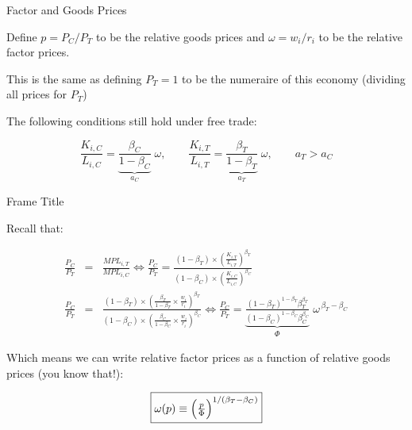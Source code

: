\documentclass[notes,11pt, aspectratio=169, xcolor=table]{beamer}
\newenvironment{wideitemize}{\itemize\addtolength{\itemsep}{10pt}}{\enditemize}
\begin{document}
\begin{frame}{Factor and Goods Prices}
    \begin{wideitemize}
        \item Define $p = P_C / P_T$ to be the relative goods prices and $\omega = w_i /r_i$ to be the relative factor prices. 

        \item This is the same as defining $P_T=1$ to be the numeraire of this economy (dividing all prices for $P_T$)

        \item The following conditions still hold under free trade:

        \begin{equation*}
            \frac{K_{i,C}}{L_{i,C}} = 
      \underbrace{\frac{\beta_C}{1-\beta_C}}_{a_C}\;
      \omega,\qquad \frac{K_{i,T}}{L_{i,T}} = 
      \underbrace{\frac{\beta_T}{1-\beta_T}}_{a_T}\;
      \omega, \qquad a_T>a_C
        \end{equation*}

    \end{wideitemize}
\end{frame}

\begin{frame}{Frame Title}
    \begin{wideitemize}
        \item Recall that:

    \begin{eqnarray*}
        \frac{P_C}{P_T} &=& \frac{MPL_{i,T}}{MPL_{i,C}} \iff 
        \frac{P_C}{P_T} = \frac{(1-\beta_T) \times \left( \frac{K_{i,T}}{L_{i,T}} \right)^{\beta_T}}{ (1-\beta_C) \times \left( \frac{K_{i,C}}{L_{i,C}} \right)^{\beta_C}}  \\
    \frac{P_C}{P_T} &=& \frac{(1-\beta_T) \times \left( \frac{\beta_T}{1-\beta_T} \times \frac{w_i}{r_i}  \right)^{\beta_T}}{ (1-\beta_C) \times \left( \frac{\beta_C}{1-\beta_C} \times \frac{w_i}{r_i} \right)^{\beta_C}} \iff \frac{P_C}{P_T} = \underbrace{\frac{(1-\beta_T)^{1-\beta_T}\beta_T^{\beta_T}}
                          {(1-\beta_C)^{1-\beta_C}\beta_C^{\beta_C}}}_{\Phi}
          \;\omega^{\,\beta_T-\beta_C}
\end{eqnarray*} 

    \item Which means we can write relative factor prices as a function of relative goods prices (you know that!):

    \begin{equation*}
    \boxed{
        \omega(p) \equiv \Bigl(\tfrac{p}{\Phi}\Bigr)^{1/(\beta_T-\beta_C)}
    }
    \end{equation*}

    \end{wideitemize}
\end{frame}
\end{document}
